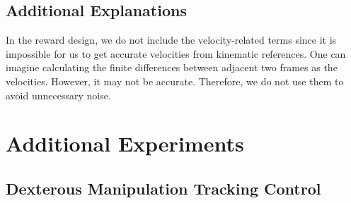 








\subsection{Additional Explanations} \label{sec:supp_method_additional_details}

In the reward design, we do not include the velocity-related terms since it is impossible for us to get accurate velocities from kinematic references. One can imagine calculating the finite differences between adjacent two frames as the velocities. However, it may not be accurate. Therefore, we do not use them to avoid unnecessary noise. 


 
\section{Additional Experiments} \label{sec:supp_exp}

\subsection{Dexterous Manipulation Tracking Control} \label{sec:supp_exp_dex_manip_control}




